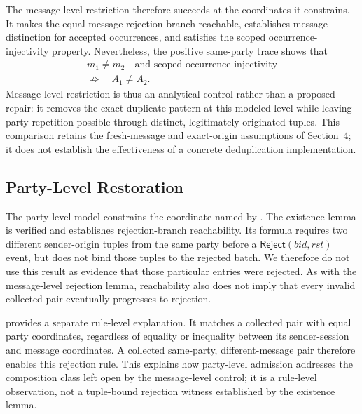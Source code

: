 The message-level restriction therefore succeeds at the coordinates it
constrains. It makes the equal-message rejection branch reachable, establishes
message distinction for accepted occurrences, and satisfies the scoped
occurrence-injectivity property. Nevertheless, the positive same-party trace
shows that
\begin{equation}
  \begin{gathered}
  m_1\neq m_2
  \quad\text{and scoped occurrence injectivity}
  \\ \not\Longrightarrow\quad
  A_1\neq A_2.
  \end{gathered}
  \label{eq:message-not-party}
\end{equation}
Message-level restriction is thus an analytical control rather than a proposed
repair: it removes the exact duplicate pattern at this modeled level while
leaving party repetition possible through distinct, legitimately originated
tuples. This comparison retains the fresh-message and exact-origin assumptions
of Section~4; it does not establish the effectiveness of a concrete
deduplication implementation.

\subsection{Party-Level Restoration}

The party-level model constrains the coordinate named by \distinctparty. The
existence lemma  is verified and establishes
rejection-branch reachability. Its formula requires two different sender-origin
tuples from the same party before a \(\mathsf{Reject}(\mathit{bid},\mathit{rst})\)
event, but does not bind those tuples to the rejected batch. We therefore do
not use this result as evidence that those particular entries were rejected.
As with the message-level rejection lemma, reachability also does not imply
that every invalid collected pair eventually progresses to rejection.

 provides a separate rule-level explanation.
It matches a collected pair with equal party coordinates, regardless of
equality or inequality between its
sender-session and message coordinates. A collected same-party,
different-message pair therefore enables this rejection rule. This explains
how party-level admission addresses the composition class left open by the
message-level control; it is a rule-level observation, not a tuple-bound
rejection witness established by the existence lemma.

